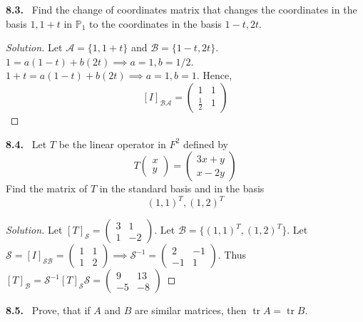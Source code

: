 \documentclass[12pt]{amsart}
\DeclareMathOperator{\tr}{tr}
\theoremstyle{plain}
\theoremstyle{definition}
\theoremstyle{remark}
\newenvironment{problem}[1]{\par\medskip\noindent\textbf{#1.}\ }{\par\smallskip}
\newenvironment{solution}{\begin{proof}[Solution]}{\end{proof}}
\begin{document}
\begin{problem}{8.3}
    Find the change of coordinates matrix that changes the coordinates in the basis $1,1+t$ in $\mathbb{P}_1$ to the coordinates in the basis $1-t,2t$.
\end{problem}

\begin{solution}
Let $\mathcal{A} = \{1,1+t\}$ and $\mathcal{B} = \{1-t,2t\}$. $1 = a(1-t) + b(2t) \implies a = 1, b=1/2.$ $1+t = a(1-t)+b(2t) \implies a=1,b =1$. Hence,
\[[I]_{\mathcal{B}\mathcal{A}} = \begin{pmatrix}
    1 & 1 \\ \frac{1}{2} & 1
\end{pmatrix}\]
\end{solution}

\begin{problem}{8.4}
    Let $T$ be the linear operator in $F^2$ defined by 
    \[T \begin{pmatrix}
        x \\ y
    \end{pmatrix} = \begin{pmatrix}
        3x+y \\ x-2y
    \end{pmatrix}\]
    Find the matrix of $T$ in the standard basis and in the basis \[(1,1)^T, (1,2)^T\]
\end{problem}

\begin{solution}
    Let $[T]_\mathcal{S} = \begin{pmatrix} 3 & 1 \\ 1 & -2   \end{pmatrix}$. Let $\mathcal{B} = \{(1,1)^T,(1,2)^T\}$. Let $\mathcal{S} = [I]_{\mathcal{S}\mathcal{B}} = \begin{pmatrix}
        1 & 1 \\ 1 & 2
    \end{pmatrix} \implies \mathcal{S}^{-1} = \begin{pmatrix}
        2 & -1 \\ -1 & 1
    \end{pmatrix}$. Thus $[T]_\mathcal{B} = \mathcal{S}^{-1}[T]_\mathcal{S} \mathcal{S} = \begin{pmatrix}
        9 & 13 \\ -5 & -8
    \end{pmatrix}$
\end{solution}

\begin{problem}{8.5}
    Prove, that if $A$ and $B$ are similar matrices, then $\tr A = \tr B$. 
\end{problem}
\end{document}
